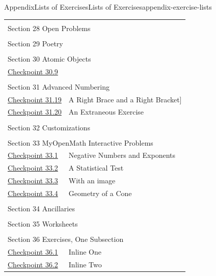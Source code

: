 \documentclass[twoside,10pt,]{article}
\numberwithin{equation}{section}
\begin{document}
\begin{appendixptx}{Appendix}{Lists of Exercises}{}{Lists of Exercises}{}{}{appendix-exercise-lists}
\begin{longtable}[l]{ll}
\multicolumn{2}{l}{\null}\\[1.5ex] \multicolumn{2}{l}{\large Section 28 Open Problems}\\[0.5ex]
\multicolumn{2}{l}{\null}\\[1.5ex] \multicolumn{2}{l}{\large Section 29 Poetry}\\[0.5ex]
\multicolumn{2}{l}{\null}\\[1.5ex] \multicolumn{2}{l}{\large Section 30 Atomic Objects}\\[0.5ex]
\hyperref[atomic-image-25]{Checkpoint 30.9}& \\
\multicolumn{2}{l}{\null}\\[1.5ex] \multicolumn{2}{l}{\large Section 31 Advanced Numbering}\\[0.5ex]
\hyperref[exercise-difficult-title]{Checkpoint 31.19}& A Right Brace \textbraceright{} and a Right Bracket]\\
\hyperref[section-advanced-numbering-12-2]{Checkpoint 31.20}& An Extraneous Exercise\\
\multicolumn{2}{l}{\null}\\[1.5ex] \multicolumn{2}{l}{\large Section 32 Customizations}\\[0.5ex]
\multicolumn{2}{l}{\null}\\[1.5ex] \multicolumn{2}{l}{\large Section 33 MyOpenMath Interactive Problems}\\[0.5ex]
\hyperref[section-myopenmath-3]{Checkpoint 33.1}& Negative Numbers and Exponents\\
\hyperref[section-myopenmath-4]{Checkpoint 33.2}& A Statistical Test\\
\hyperref[section-myopenmath-5]{Checkpoint 33.3}& With an image\\
\hyperref[section-myopenmath-6]{Checkpoint 33.4}& Geometry of a Cone\\
\multicolumn{2}{l}{\null}\\[1.5ex] \multicolumn{2}{l}{\large Section 34 Ancillaries}\\[0.5ex]
\multicolumn{2}{l}{\null}\\[1.5ex] \multicolumn{2}{l}{\large Section 35 Worksheets}\\[0.5ex]
\multicolumn{2}{l}{\null}\\[1.5ex] \multicolumn{2}{l}{\large Section 36 Exercises, One Subsection}\\[0.5ex]
\hyperref[section-exercises-single-5]{Checkpoint 36.1}& Inline One\\
\hyperref[duplicate-inline]{Checkpoint 36.2}& Inline Two\\

\end{longtable}
\end{appendixptx}
\end{document}
